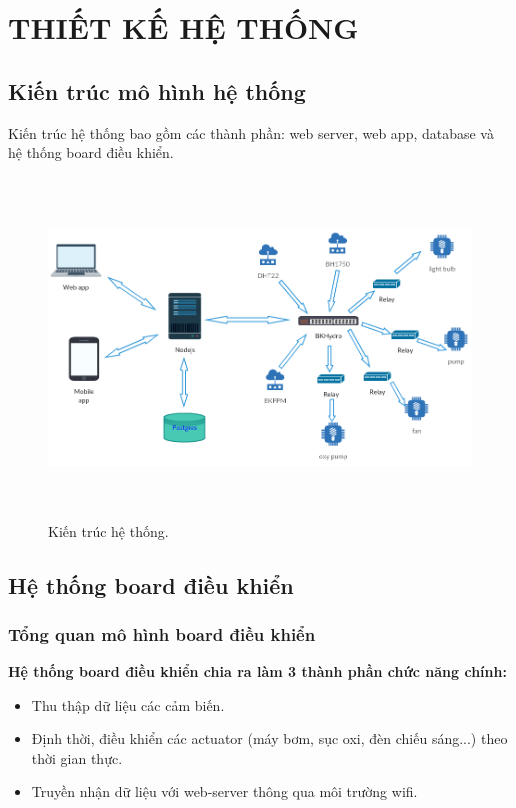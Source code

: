 \documentclass[a4paper,12pt,oneside]{article}
\begin{document}
\newpage
\section{THIẾT KẾ HỆ THỐNG}
\subsection{Kiến trúc mô hình hệ thống}
\noindent Kiến trúc hệ thống bao gồm các thành phần: web server, web app, database và hệ thống board điều khiển. 

\begin{figure}[H]
	\centering
	\includegraphics[height=9cm,width=13cm]{hinh/system.png}
	\caption{Kiến trúc hệ thống.}
	\label{fig:system}
\end{figure}


\subsection{Hệ thống board điều khiển}

\subsubsection{Tổng quan mô hình board điều khiển}

\noindent \textbf{Hệ thống board điều khiển chia ra làm 3 thành phần chức năng chính:}
\begin{itemize}
\item Thu thập dữ liệu các cảm biến.
\item Định thời, điều khiển các actuator (máy bơm, sục oxi, đèn chiếu sáng...) theo thời gian thực.
\item Truyền nhận dữ liệu với web-server thông qua môi trường wifi.

\end{itemize}
\end{document}
